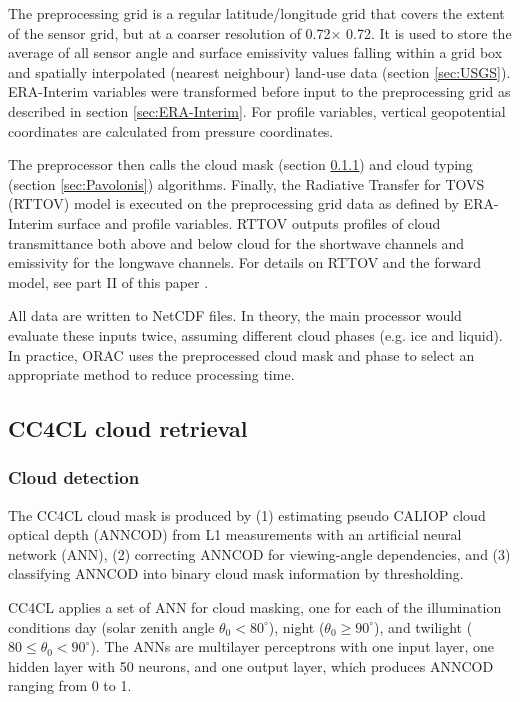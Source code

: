 The preprocessing grid is a regular latitude/longitude grid that covers the extent of the sensor grid, but at a coarser resolution of 0.72\textdegree $\times$ 0.72\textdegree. It is used to store the average of all sensor angle and surface emissivity values falling within a grid box and spatially interpolated (nearest neighbour) land-use data (section \ref{sec:USGS}). ERA-Interim variables were transformed before input to the preprocessing grid as described in section \ref{sec:ERA-Interim}. For profile variables, vertical geopotential coordinates are calculated from pressure coordinates.

The preprocessor then calls the cloud mask (section \ref{sec:CloudMask}) and cloud typing (section \ref{sec:Pavolonis}) algorithms. Finally, the Radiative Transfer for TOVS (RTTOV) model is executed on the preprocessing grid data as defined by ERA-Interim surface and profile variables. RTTOV outputs profiles of cloud transmittance both above and below cloud for the shortwave channels and emissivity for the longwave channels. For details on RTTOV and the forward model, see part II of this paper \citep{GregPart2}.

All data are written to NetCDF files. In theory, the main processor would evaluate these inputs twice, assuming different cloud phases (e.g. ice and liquid). In practice, ORAC uses the preprocessed cloud mask and phase to select an appropriate method to reduce processing time.

\subsection{CC4CL cloud retrieval}

\subsubsection{Cloud detection}\label{sec:CloudMask}

The CC4CL cloud mask is produced by (1) estimating pseudo CALIOP cloud optical depth (ANNCOD) from L1 measurements with an artificial neural network (ANN), (2) correcting ANNCOD for viewing-angle dependencies, and (3) classifying ANNCOD into binary cloud mask information by thresholding.

CC4CL applies a set of ANN for cloud masking, one for each of the illumination conditions day (solar zenith angle $\theta_{0} < 80^{\circ}$), night ($\theta_{0} \ge 90^{\circ}$), and twilight ($80 \le \theta_{0} < 90^{\circ}$). The ANNs are multilayer perceptrons with one input layer, one hidden layer with 50 neurons, and one output layer, which produces ANNCOD ranging from 0 to 1.

